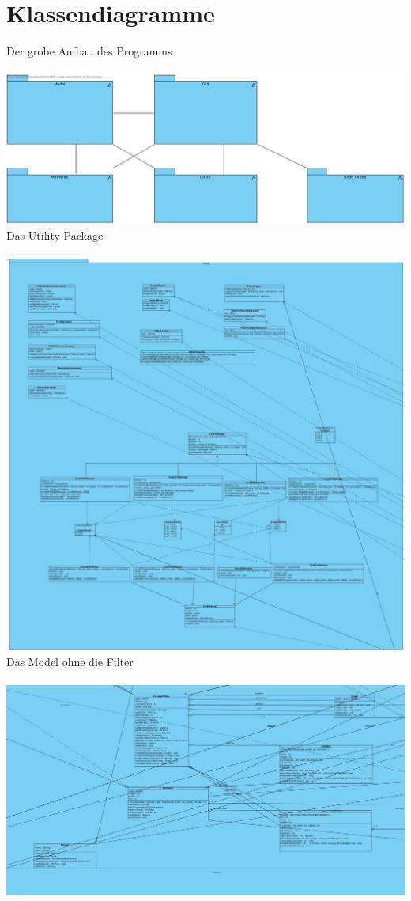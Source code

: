 \documentclass[twoside]{book}
\newcommand{\+}{\discretionary{\mbox{\scriptsize$\hookleftarrow$}}{}{}}
\begin{document}
\section{Klassendiagramme}
Der grobe Aufbau des Programms\\\\
{\centering\includegraphics[width=1\textwidth]{Grobuebersicht.jpg}}\\
\newpage
Das Utility Package\\\\
{\centering\includegraphics[width=1\textwidth]{Utility.jpg}}\\
\newpage
Das Model ohne die Filter\\\\
{\centering\includegraphics[width=1\textwidth]{Model_noFilter.jpg}}\\
\end{document}
